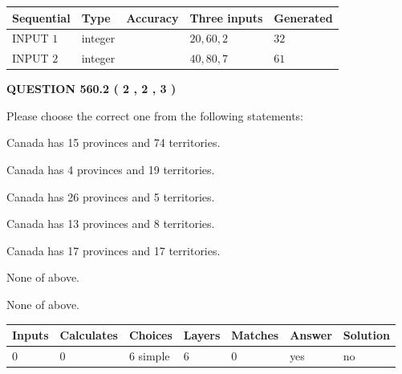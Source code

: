 \documentclass[12pt]{article}
\begin{document}
   
  
  
\noindent\begin{tabular}{|l|l|l|l|l|}
\hline
 Sequential & Type & Accuracy & Three inputs & Generated \\ 
\hline
 
 
  INPUT $  1 $ & integer &  & $
 20
 , 
 60
 , 
 2
 $ & $ 32 $ 
 \\  \hline  
 
 
  INPUT $  2 $ & integer &  & $
 40
 , 
 80
 , 
 7
 $ & $ 61 $ 
 \\  \hline  
 \end{tabular}
   
   
  
\vspace{0.2in}
  
{\textbf{\Large{QUESTION
560.2 
 ( 2 , 2 , 3 )
}}}
  
  
Please choose the correct one from the following statements:
 
 
Canada has  15 provinces and  74 territories.
 
 
Canada has   4 provinces and  19 territories.
 
 
Canada has  26 provinces and  5 territories.
 
 
Canada has  13 provinces and  8 territories.
 
 
Canada has  17 provinces and  17 territories.
 
 
 None of above.
 
 
\noindent{}
 
 
 None of above.
 
 
\noindent{}
 
 
   
   
   
   
\noindent\begin{tabular}{|l|l|l|l|l|l|l|}
 \hline
Inputs & Calculates & Choices & Layers & Matches & Answer & Solution \\ \hline
 0  & 
 0  & 
 6
  simple  
  & 
 6  & 
 0  & 
  yes & 
  no 
  \\ \hline
 \end{tabular}
   
\end{document}
